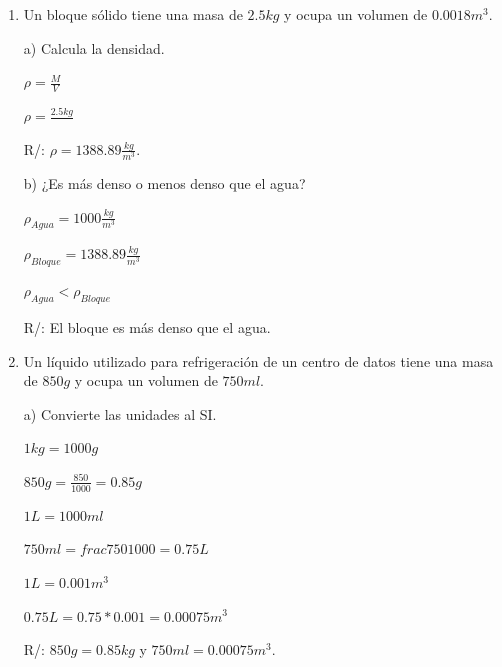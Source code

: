 \documentclass[a4paper, 11pt]{article}
\newcommand{\Pspace}{0.5cm}
\newcommand{\Aspace}{0.2cm}
\begin{document}
    \begin{enumerate}
        \vspace{\Pspace}
        \item Un bloque sólido tiene una masa de $2.5kg$ y ocupa un volumen de $0.0018m^3$. \par
            \vspace{\Aspace} \par
            a) Calcula la densidad.
            \\ { \color{azul}  
                $\rho = \frac{M}{V}$
                \par $\rho = \frac{2.5kg}{}$
                \par R/: $\rho = 1388.89 \frac{kg}{m^3}$.
            }

            \vspace{\Aspace} \par
            b) ¿Es más denso o menos denso que el agua?
            \\ { \color{azul} 
                $\rho_{Agua} = 1000 \frac{kg}{m^{3}}$
                \par $\rho_{Bloque} = 1388.89 \frac{kg}{m^{3}}$
                \par $\rho_{Agua} < \rho_{Bloque}$
                \par R/: El bloque es más denso que el agua.
            }



        \vspace{\Pspace}
        \item Un líquido utilizado para refrigeración de un centro de datos tiene una masa de $850g$ y ocupa un volumen de $750ml$. \par
            \vspace{\Aspace} \par
            a) Convierte las unidades al SI.
            \\ { \color{azul} 
                $1kg = 1000g$
                \par $850g = \frac{850}{1000} = 0.85g$
                \par $1L = 1000ml$
                \par $750ml = frac{750}{1000} = 0.75L$
                \par $1L = 0.001m^{3}$
                \par $0.75L = 0.75 * 0.001 = 0.00075m^{3}$
                \par R/: $850g = 0.85kg$ y $750ml = 0.00075m^{3}$.
            }


\end{enumerate}
\end{document}
